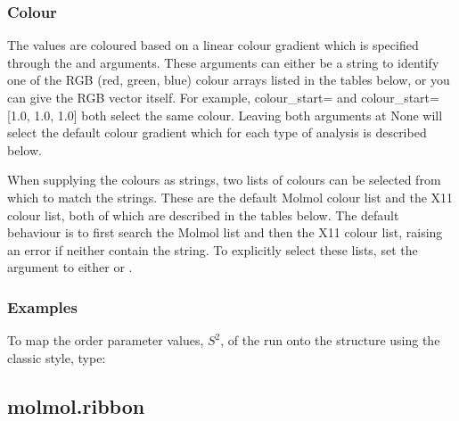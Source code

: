   
 \subsubsection{Colour} 

 The values are coloured based on a linear colour gradient which is specified through the  and  arguments.  These arguments can either be a string to identify one of the RGB (red, green, blue) colour arrays listed in the tables below, or you can give the RGB vector itself.  For example, colour\_start= and colour\_start=[1.0, 1.0, 1.0] both select the same colour.  Leaving both arguments at None will select the default colour gradient which for each type of analysis is described below. 
  

 When supplying the colours as strings, two lists of colours can be selected from which to match the strings.  These are the default Molmol colour list and the X11 colour list, both of which are described in the tables below.  The default behaviour is to first search the Molmol list and then the X11 colour list, raising an error if neither contain the string. To explicitly select these lists, set the  argument to either  or . 
  

  
 \subsubsection{Examples} 

 To map the order parameter values, $S^2$, of the run  onto the structure using the classic style, type: 
  




  

 \newpage 

 \subsection{molmol.ribbon} 

